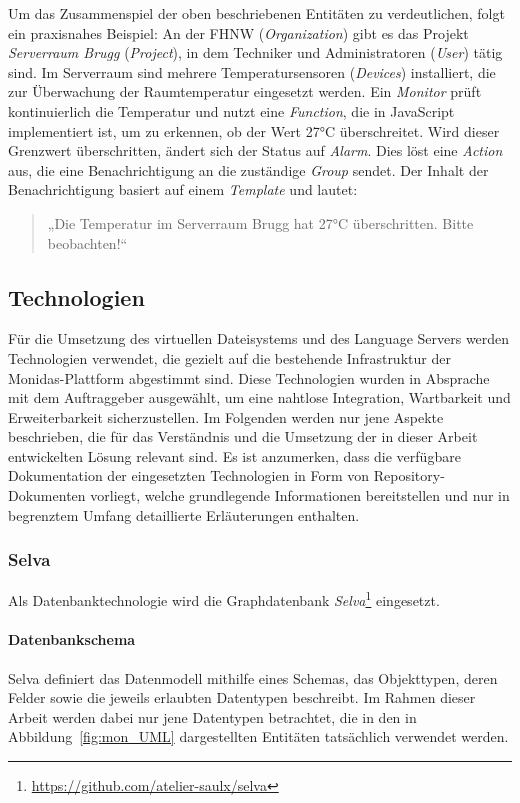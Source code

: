 Um das Zusammenspiel der oben beschriebenen Entitäten zu verdeutlichen, folgt ein praxisnahes Beispiel:  
An der FHNW (\textit{Organization}) gibt es das Projekt \textit{Serverraum Brugg} (\textit{Project}), in dem Techniker und Administratoren (\textit{User}) tätig sind. Im Serverraum sind mehrere Temperatursensoren (\textit{Devices}) installiert, die zur Überwachung der Raumtemperatur eingesetzt werden. Ein \textit{Monitor} prüft kontinuierlich die Temperatur und nutzt eine \textit{Function}, die in JavaScript implementiert ist, um zu erkennen, ob der Wert 27°C überschreitet.  
Wird dieser Grenzwert überschritten, ändert sich der Status auf \textit{Alarm}. Dies löst eine \textit{Action} aus, die eine Benachrichtigung an die zuständige \textit{Group} sendet. Der Inhalt der Benachrichtigung basiert auf einem \textit{Template} und lautet:

\begin{quote}
  „Die Temperatur im Serverraum Brugg hat 27°C überschritten. Bitte beobachten!“
\end{quote}


\subsection{Technologien}
\label{abb:tech}
Für die Umsetzung des virtuellen Dateisystems und des Language Servers werden Technologien verwendet, die gezielt auf die bestehende Infrastruktur der Monidas-Plattform abgestimmt sind. Diese Technologien wurden in Absprache mit dem Auftraggeber ausgewählt, um eine nahtlose Integration, Wartbarkeit und Erweiterbarkeit sicherzustellen. Im Folgenden werden nur jene Aspekte beschrieben, die für das Verständnis und die Umsetzung der in dieser Arbeit entwickelten Lösung relevant sind. Es ist anzumerken, dass die verfügbare Dokumentation der eingesetzten Technologien in Form von Repository-Dokumenten vorliegt, welche grundlegende Informationen bereitstellen und nur in begrenztem Umfang detaillierte Erläuterungen enthalten.

\subsubsection*{Selva}

Als Datenbanktechnologie wird die Graphdatenbank \textit{Selva}\footnote{\url{https://github.com/atelier-saulx/selva}} eingesetzt.

\paragraph{Datenbankschema}
Selva definiert das Datenmodell mithilfe eines Schemas, das Objekttypen, deren Felder sowie die jeweils erlaubten Datentypen beschreibt. Im Rahmen dieser Arbeit werden dabei nur jene Datentypen betrachtet, die in den in Abbildung~\ref{fig:mon_UML} dargestellten Entitäten tatsächlich verwendet werden.


